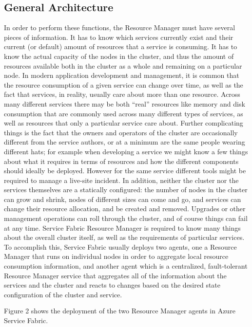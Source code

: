 \subsection{General Architecture}
In order to perform these functions, the Resource Manager must have
several pieces of information. It has to know which services currently
exist and their current (or default) amount of resources that a
service is consuming. It has to know the actual capacity of the nodes
in the cluster, and thus the amount of resources available both in the
cluster as a whole and remaining on a particular node. In modern
application development and management, it is common that the resource
consumption of a given service can change over time, as well as the
fact that services, in reality, usually care about more than one
resource. Across many different services there may be both “real”
resources like memory and disk consumption that are commonly used
across many different types of services, as well as resources that
only a particular service care about.  Further complicating things is
the fact that the owners and operators of the cluster are occasionally
different from the service authors, or at a minimum are the same
people wearing different hats; for example when developing a service
we might know a few things about what it requires in terms of
resources and how the different components should ideally be
deployed. However for the same service different tools might be
required to manage a live-site incident. In addition, neither the
cluster nor the services themselves are a statically configured: the
number of nodes in the cluster can grow and shrink, nodes of different
sizes can come and go, and services can change their resource
allocation, and be created and removed. Upgrades or other management
operations can roll through the cluster, and of course things can fail
at any time.  Service Fabric Resource Manager is required to know many
things about the overall cluster itself, as well as the requirements
of particular services. To accomplish this, Service Fabric usually
deploys two agents, one a Resource Manager that runs on individual
nodes in order to aggregate local resource consumption information,
and another agent which is a centralized, fault-tolerant Resource
Manager service that aggregates all of the information about the
services and the cluster and reacts to changes based on the desired
state configuration of the cluster and service.

Figure 2 shows the deployment of the two Resource Manager agents in
Azure Service Fabric.

